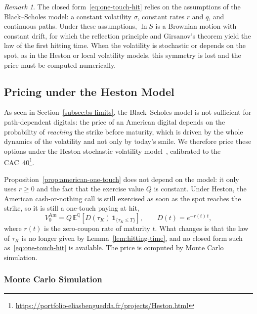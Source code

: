 \documentclass[11pt,a4paper]{article}
\theoremstyle{remark}
\newtheorem{remark}{Remark}[section]
\newcommand{\E}{\mathbb{E}}
\newcommand{\Q}{\mathbb{Q}}
\newcommand{\ind}{\mathbf{1}}
\begin{document}
\begin{remark}
The closed form~\eqref{eq:one-touch-hit} relies on the assumptions of the
Black--Scholes model: a constant volatility $\sigma$, constant rates $r$ and
$q$, and continuous paths. Under these assumptions, $\ln S$ is a Brownian
motion with constant drift, for which the reflection principle and Girsanov's
theorem yield the law of the first hitting time. When the volatility is
stochastic or depends on the spot, as in the Heston or local volatility
models, this symmetry is lost and the price must be computed numerically.
\end{remark}


\subsection{Pricing under the Heston Model}
\label{subsec:heston-american}

As seen in Section~\ref{subsec:bs-limits}, the Black--Scholes model is not
sufficient for path-dependent digitals: the price of an American digital
depends on the probability of \emph{reaching} the strike before maturity, which
is driven by the whole dynamics of the volatility and not only by today's
smile. We therefore price these options under the Heston stochastic volatility
model~\cite{Heston1993}, calibrated to the CAC~40\footnote{\url{https://portfolio-eliasbenguedda.fr/projects/Heston.html}}.

Proposition~\ref{prop:american-one-touch} does not depend on the model: it only
uses $r \geq 0$ and the fact that the exercise value $Q$ is constant. Under
Heston, the American cash-or-nothing call is still exercised as soon as the
spot reaches the strike, so it is still a one-touch paying at hit,
\begin{equation}
  V^{\mathrm{Am}}_0 = Q\,\E^{\Q}\!\left[D(\tau_K)\,\ind_{\{\tau_K \leq T\}}\right],
  \qquad D(t) = e^{-r(t)\,t},
  \label{eq:heston-american}
\end{equation}
where $r(t)$ is the zero-coupon rate of maturity $t$. What changes is that the
law of $\tau_K$ is no longer given by Lemma~\ref{lem:hitting-time}, and no
closed form such as~\eqref{eq:one-touch-hit} is available. The price is
computed by Monte Carlo simulation.

\subsubsection{Monte Carlo Simulation}
\end{document}
